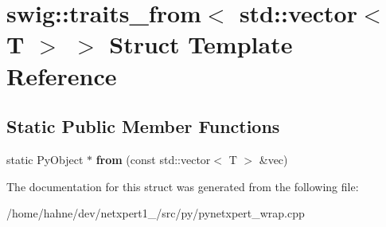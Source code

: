 \hypertarget{structswig_1_1traits__from_3_01std_1_1vector_3_01T_01_4_01_4}{}\section{swig\+:\+:traits\+\_\+from$<$ std\+:\+:vector$<$ T $>$ $>$ Struct Template Reference}
\label{structswig_1_1traits__from_3_01std_1_1vector_3_01T_01_4_01_4}
\subsection*{Static Public Member Functions}
\begin{DoxyCompactItemize}
\item 
static Py\+Object $\ast$ {\bfseries from} (const std\+::vector$<$ T $>$ \&vec)\hypertarget{structswig_1_1traits__from_3_01std_1_1vector_3_01T_01_4_01_4_a4c2827dea351d54dea6d21c7a227134b}{}\label{structswig_1_1traits__from_3_01std_1_1vector_3_01T_01_4_01_4_a4c2827dea351d54dea6d21c7a227134b}

\end{DoxyCompactItemize}


The documentation for this struct was generated from the following file\+:\begin{DoxyCompactItemize}
\item 
/home/hahne/dev/netxpert1\+\_/src/py/pynetxpert\+\_\+wrap.\+cpp\end{DoxyCompactItemize}
